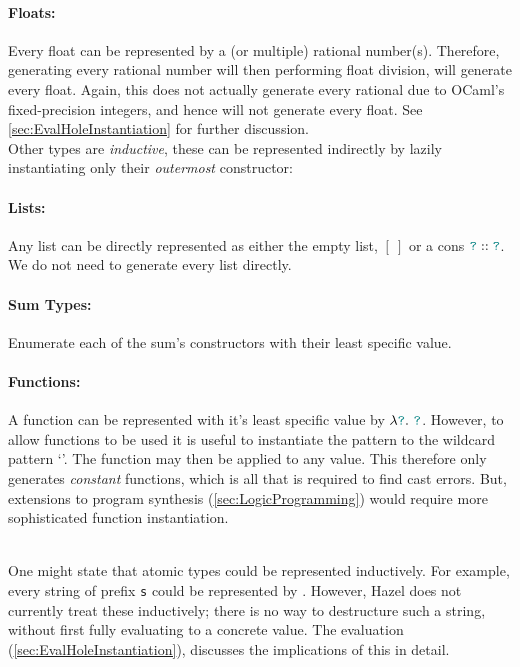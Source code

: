 \paragraph{Floats:} Every float can be represented by a (or multiple) rational number(s). Therefore, generating every rational number will then performing float division, will generate every float. Again, this does not actually generate every rational due to OCaml's fixed-precision integers, and hence will not generate every float. See \cref{sec:EvalHoleInstantiation} for further discussion.
 \\
 
Other types are \textit{inductive}, these can be represented indirectly by lazily instantiating only their \textit{outermost} constructor: 
 
\paragraph{Lists:} Any list can be directly represented as either the empty list, $[\ ]$ or a cons ${\color{teal}\texttt{?}} :: {\color{teal}\texttt{?}}$. We do not need to generate every list directly.
\paragraph{Sum Types:} Enumerate each of the sum's constructors with their least specific value.
\paragraph{Functions:} A function can be represented with it's least specific value by $\lambda {\color{teal}\texttt{?}}.\ {\color{teal}\texttt{?}}$. However, to allow functions to be used it is useful to instantiate the pattern to the wildcard pattern `\code{_}'. The function may then be applied to any value. This therefore only generates \textit{constant} functions, which is all that is required to find cast errors. But, extensions to program synthesis (\cref{sec:LogicProgramming}) would require more sophisticated function instantiation.

\ \\

One might state that atomic types could be represented inductively. For example, every string of prefix \texttt{s} could be represented by . However, Hazel does not currently treat these inductively; there is no way to destructure such a string, without first fully evaluating to a concrete value. The evaluation (\cref{sec:EvalHoleInstantiation}), discusses the implications of this in detail.


